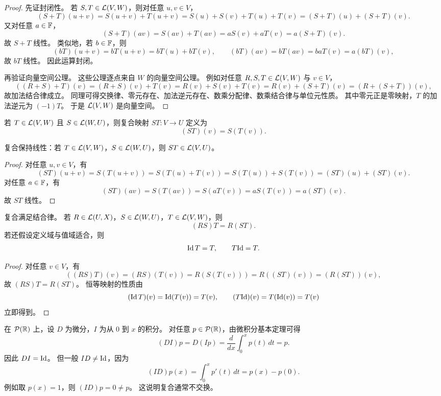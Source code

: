 \begin{proof} 先证封闭性。 若 $S,T\in\mathcal{L}(V,W)$，则对任意 $u,v\in V$， \[
(S+T)(u+v)=S(u+v)+T(u+v)=S(u)+S(v)+T(u)+T(v)=(S+T)(u)+(S+T)(v). \] 又对任意 $a\in\mathbb{F}$， \[
(S+T)(av)=S(av)+T(av)=aS(v)+aT(v)=a(S+T)(v). \] 故 $S+T$ 线性。 类似地，若 $b\in\mathbb{F}$，则 \[
(bT)(u+v)=bT(u+v)=bT(u)+bT(v),\qquad (bT)(av)=bT(av)=baT(v)=a(bT)(v), \] 故 $bT$ 线性。
因此运算封闭。

再验证向量空间公理。 这些公理逐点来自 $W$ 的向量空间公理。 例如对任意 $R,S,T\in\mathcal{L}(V,W)$ 与 $v\in V$， \[
((R+S)+T)(v)=(R+S)(v)+T(v)=R(v)+S(v)+T(v)=R(v)+(S+T)(v)=(R+(S+T))(v), \] 故加法结合律成立。
同理可得交换律、零元存在、加法逆元存在、数乘分配律、数乘结合律与单位元性质。 其中零元正是零映射，$T$ 的加法逆元为 $(-1)T$。 于是 $\mathcal{L}(V,W)$
是向量空间。 \end{proof}

\begin{definition} 若 $T\in\mathcal{L}(V,W)$ 且 $S\in\mathcal{L}(W,U)$，则复合映射 $ST:V\to U$ 定义为 \[
(ST)(v)=S(T(v)). \] \end{definition}

\begin{proposition} 复合保持线性：若 $T\in\mathcal{L}(V,W)$，$S\in\mathcal{L}(W,U)$，则 $ST\in\mathcal{L}(V,U)$。
\end{proposition}

\begin{proof} 对任意 $u,v\in V$，有 \[
(ST)(u+v)=S(T(u+v))=S(T(u)+T(v))=S(T(u))+S(T(v))=(ST)(u)+(ST)(v). \] 对任意 $a\in\mathbb{F}$，有 \[
(ST)(av)=S(T(av))=S(aT(v))=aS(T(v))=a(ST)(v). \] 故 $ST$ 线性。 \end{proof}

\begin{proposition} 复合满足结合律。 若 $R\in\mathcal{L}(U,X)$，$S\in\mathcal{L}(W,U)$，$T\in\mathcal{L}(V,W)$，则 \[
(RS)T=R(ST). \] 若还假设定义域与值域适合，则 \[ \mathrm{Id}\,T=T,\qquad T\mathrm{Id}=T. \] \end{proposition}

\begin{proof} 对任意 $v\in V$，有 \[ ((RS)T)(v)=(RS)(T(v))=R(S(T(v)))=R((ST)(v))=(R(ST))(v),
\] 故 $(RS)T=R(ST)$。 恒等映射的性质由 \[ (\mathrm{Id}\,T)(v)=\mathrm{Id}(T(v))=T(v),\qquad
(T\mathrm{Id})(v)=T(\mathrm{Id}(v))=T(v) \] 立即得到。 \end{proof}

\begin{example} 在 $\mathcal{P}(\mathbb{R})$ 上，设 $D$ 为微分，$I$ 为从 $0$ 到 $x$ 的积分。 对任意
$p\in\mathcal{P}(\mathbb{R})$，由微积分基本定理可得 \[ (DI)p=D(Ip)=\frac{d}{dx}\int_0^x p(t)\,dt=p. \] 因此
$DI=\mathrm{Id}$。 但一般 $ID\neq\mathrm{Id}$，因为 \[ (ID)p(x)=\int_0^x p'(t)\,dt=p(x)-p(0). \] 例如取 $p(x)=1$，则
$(ID)p=0\neq p$。 这说明复合通常不交换。 \end{example}

